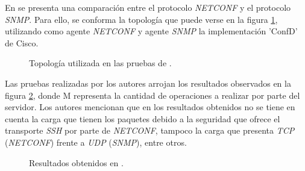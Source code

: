 En \parencite{netconfvssnmp} se presenta una comparación entre el protocolo \textit{NETCONF} y el protocolo \textit{SNMP}. Para ello, se conforma la topología que puede verse en la figura \ref{fig:netconfvssnmp1}, utilizando como agente \textit{NETCONF} y agente \textit{SNMP} la implementación 'ConfD' de Cisco.

\begin{figure}[H]
	\centering 
	\caption[Topología utilizada en las pruebas de.]{Topología utilizada en las pruebas de \parencite{netconfvssnmp}.}
	\label{fig:netconfvssnmp1}
\end{figure}

Las pruebas realizadas por los autores arrojan los resultados observados en la figura \ref{fig:netconfvssnmp2}, donde M representa la cantidad de operaciones a realizar por parte del servidor. Los autores mencionan que en los resultados obtenidos no se tiene en cuenta la carga que tienen los paquetes debido a la seguridad que ofrece el transporte \textit{SSH} por parte de \textit{NETCONF}, tampoco la carga que presenta \textit{TCP} (\textit{NETCONF}) frente a \textit{UDP} (\textit{SNMP}), entre otros.

\begin{figure}[th]
	\centering 
	\caption[Resultados obtenidos en.]{Resultados obtenidos en \parencite{netconfvssnmp}.}
	\label{fig:netconfvssnmp2}
\end{figure}

